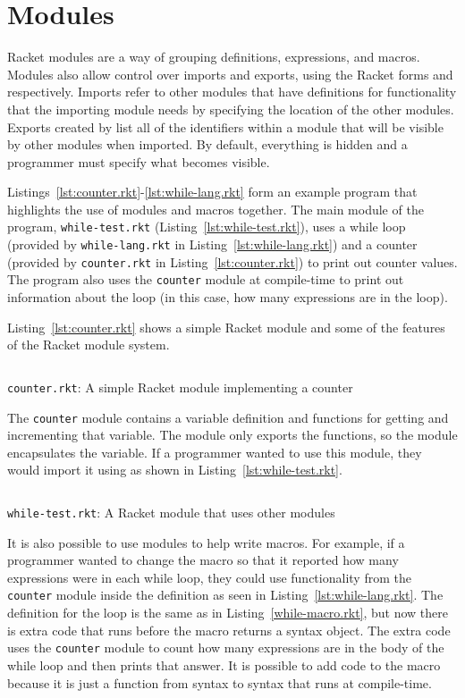 \section{Modules}
Racket modules are a way of grouping definitions, expressions, and macros. 
Modules also allow control over imports and exports, using the Racket forms  and  respectively.
Imports refer to other modules that have definitions for functionality that the importing module needs by specifying the location of the other modules.
Exports created by  list all of the identifiers within a module that will be visible by other modules when imported. 
By default, everything is hidden and a programmer must specify what becomes visible.

Listings~\ref{lst:counter.rkt}-\ref{lst:while-lang.rkt} form an example program that highlights the use of modules and macros together.
The main module of the program, \texttt{while-test.rkt} (Listing~\ref{lst:while-test.rkt}), uses a while loop (provided by \texttt{while-lang.rkt} in Listing~\ref{lst:while-lang.rkt}) and a counter (provided by \texttt{counter.rkt} in Listing~\ref{lst:counter.rkt}) to print out counter values.
The program also uses the \texttt{counter} module at compile-time to print out information about the  loop (in this case, how many expressions are in the  loop).

Listing~\ref{lst:counter.rkt} shows a simple Racket module and some of the features of the Racket module system.
\begin{listing}[tb]
  \inputminted{racket}{listings/counter.rkt}
  \caption{\texttt{counter.rkt}: A simple Racket module implementing a counter}
  \label{lst:counter.rkt}
\end{listing}
The \texttt{counter} module contains a variable definition and functions for getting and incrementing that variable.
The module only exports the functions, so the module encapsulates the variable.
If a programmer wanted to use this module, they would import it using  as shown in Listing~\ref{lst:while-test.rkt}. 

\begin{listing}[tb]
  \inputminted{racket}{listings/while-test.rkt}
  \caption{\texttt{while-test.rkt}: A Racket module that uses other modules}
  \label{lst:while-test.rkt}
\end{listing}

It is also possible to use modules to help write macros.
For example, if a programmer wanted to change the  macro so that it reported how many expressions were in each while loop, they could use functionality from the \texttt{counter} module inside the  definition as seen in Listing~\ref{lst:while-lang.rkt}.
The definition for the  loop is the same as in Listing~\ref{while-macro.rkt}, but now there is extra code that runs before the macro returns a syntax object.
The extra code uses the \texttt{counter} module to count how many expressions are in the body of the while loop and then prints that answer.
It is possible to add code to the  macro because it is just a function from syntax to syntax that runs at compile-time. 

